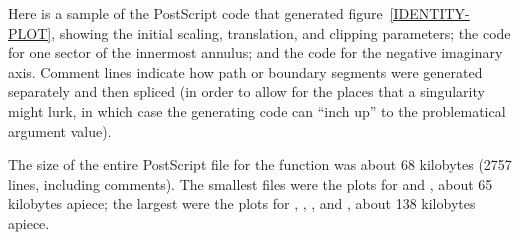 \clearpage
\endgroup
\begin{new}
Here is a sample of the PostScript code that generated
figure~\ref{IDENTITY-PLOT}, showing the initial scaling,
translation, and clipping parameters; the code for one
sector of the innermost annulus; and the code for the negative
imaginary axis.  Comment lines indicate how path or boundary
segments were generated separately and then spliced (in order to
allow for the places that a singularity might lurk, in which case
the generating code can ``inch up'' to the problematical argument
value).

The size of the entire PostScript file for the
 function was about 68 kilobytes (2757 lines, including comments).
The smallest files
were the plots for  and , about 65 kilobytes apiece;
the largest were the plots for , , , and ,
about 138 kilobytes apiece.


\end{new}
